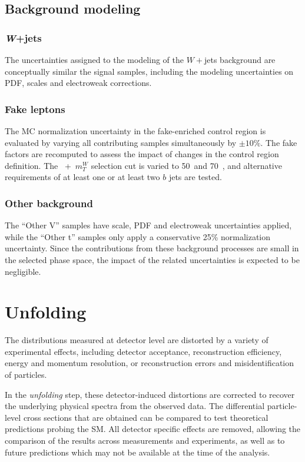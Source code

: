 \subsection{Background modeling}

\subsubsection{\textit{W}+jets}

The uncertainties assigned to the modeling of the $W+$jets background are conceptually
similar the signal samples, including the modeling uncertainties on PDF, scales
and electroweak corrections.

\subsubsection{Fake leptons}

The MC normalization uncertainty in the fake-enriched control region is evaluated by varying all contributing samples simultaneously by
$\pm 10\%$. The fake factors are recomputed to assess the impact of changes in the control region definition. The
\ETmiss~+~$m_T^W$ selection cut is varied to 50~\GeV and 70~\GeV, and alternative requirements of at least one or at least two $b$ jets are tested.

\subsubsection{Other background}

The “Other V” samples have scale, PDF and electroweak
uncertainties applied, while the “Other t” samples only apply a conservative 25\% normalization uncertainty.
Since the contributions from these background processes are small in the selected phase space, the impact of the related uncertainties is expected to be negligible.


\section{Unfolding}
\label{sec:unfolding}

The distributions measured at detector level are distorted by a variety of experimental effects, including detector acceptance, reconstruction efficiency, energy and momentum resolution, or reconstruction errors and misidentification of particles. 

In the \textit{unfolding} step, these detector-induced distortions are corrected to recover the underlying physical spectra from the observed data.
The differential particle-level cross sections that are obtained can be compared to test theoretical predictions probing the SM. All detector specific effects are removed, allowing the comparison of the results across measurements and experiments, as well as to future predictions which may not be available at the time of the analysis.

